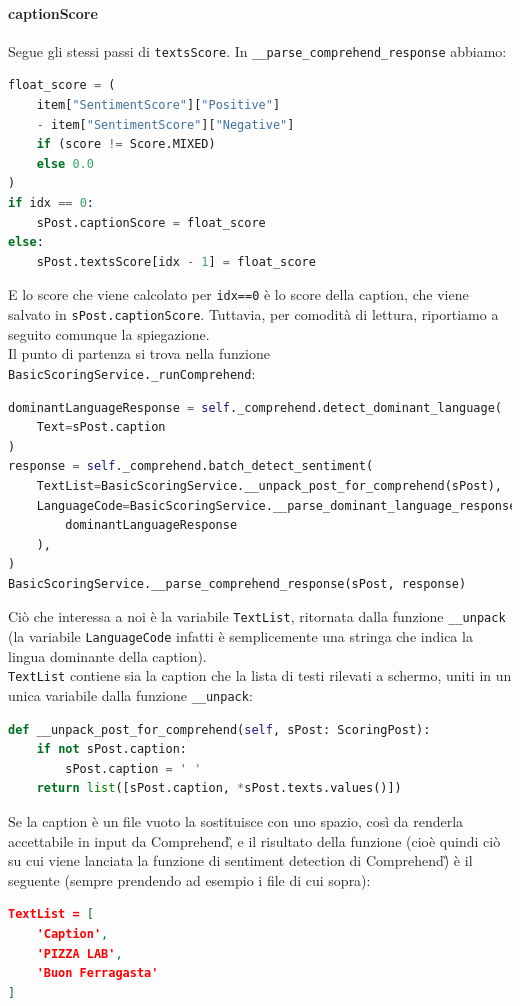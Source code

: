 \paragraph{captionScore} \aCapo
Segue gli stessi passi di \verb+textsScore+. In \verb+__parse_comprehend_response+ abbiamo:
\begin{lstlisting}[language=Python]
float_score = (
    item["SentimentScore"]["Positive"] 
    - item["SentimentScore"]["Negative"]
    if (score != Score.MIXED)
    else 0.0
)
if idx == 0:
    sPost.captionScore = float_score
else:
    sPost.textsScore[idx - 1] = float_score
\end{lstlisting}
E lo score che viene calcolato per \verb+idx==0+ è lo score della
caption, che viene salvato in \verb+sPost.captionScore+.\aCapo
Tuttavia, per comodità di lettura, riportiamo a seguito comunque la spiegazione.\\
Il punto di partenza si trova nella funzione \verb+BasicScoringService._runComprehend+:
\begin{lstlisting}[language=Python]
dominantLanguageResponse = self._comprehend.detect_dominant_language(
    Text=sPost.caption
)
response = self._comprehend.batch_detect_sentiment(
    TextList=BasicScoringService.__unpack_post_for_comprehend(sPost),
    LanguageCode=BasicScoringService.__parse_dominant_language_response(
        dominantLanguageResponse
    ),
)
BasicScoringService.__parse_comprehend_response(sPost, response)
\end{lstlisting}
Ciò che interessa a noi è la variabile \verb+TextList+, ritornata dalla funzione \verb+__unpack+ 
(la variabile \verb+LanguageCode+ infatti è semplicemente una stringa che indica la lingua dominante della caption).\\
\verb+TextList+ contiene sia la caption che la lista di testi rilevati a schermo, uniti in un
unica variabile dalla funzione \verb+__unpack+:
\begin{lstlisting}[language=Python]
def __unpack_post_for_comprehend(self, sPost: ScoringPost):
    if not sPost.caption:
        sPost.caption = ' '  
    return list([sPost.caption, *sPost.texts.values()])
\end{lstlisting}
Se la caption è un file vuoto la sostituisce con uno spazio, così da renderla accettabile in input
da Comprehend\G, e il risultato della funzione (cioè quindi ciò su cui viene lanciata la funzione di
sentiment detection di Comprehend\G) è il seguente (sempre prendendo ad esempio i file di cui sopra):
\begin{lstlisting}[language=JSON]
TextList = [
    'Caption',
    'PIZZA LAB',
    'Buon Ferragasta'
]
\end{lstlisting}
